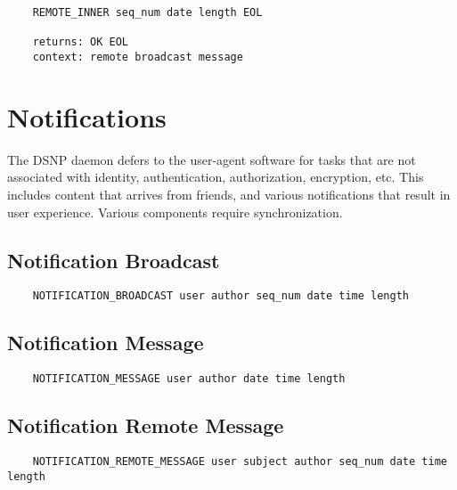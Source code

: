 \documentclass[letterpaper,11pt,oneside]{article}
\begin{document}
\vspace{10pt}
\begin{verbatim}
    REMOTE_INNER seq_num date length EOL

    returns: OK EOL
    context: remote broadcast message
\end{verbatim}

\section{Notifications}

The DSNP daemon defers to the user-agent software for tasks that are not
associated with identity, authentication, authorization, encryption, etc. This
includes content that arrives from friends, and various notifications that
result in user experience. Various components require synchronization.

\subsection{Notification Broadcast}

\vspace{10pt}
\begin{verbatim}
    NOTIFICATION_BROADCAST user author seq_num date time length 
\end{verbatim}
\vspace{10pt}

\subsection{Notification Message}

\vspace{10pt}
\begin{verbatim}
    NOTIFICATION_MESSAGE user author date time length 
\end{verbatim}
\vspace{10pt}

\subsection{Notification Remote Message}

\vspace{10pt}
\begin{verbatim}
    NOTIFICATION_REMOTE_MESSAGE user subject author seq_num date time length 
\end{verbatim}
\vspace{10pt}
\end{document}
